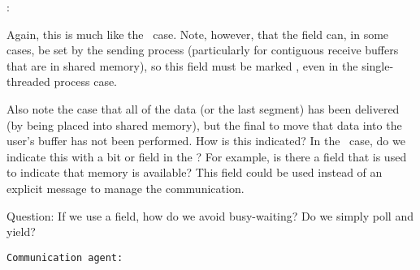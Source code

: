 :

Again, this is much like the \tcpname\ case.  Note, however, that the
 field can, in some cases, be set by the
sending process (particularly for contiguous receive buffers that are in
shared memory), so this field must be marked , even in the
single-threaded process case.

Also note the case that all of the data (or the last segment) has been
delivered (by being placed 
into shared memory), but the final  to move that data
into the user's buffer has not been performed.  How is this indicated?  
In the \shmemname\ case, do we indicate
this with a bit or field in the ?  For example, is
there a  field that is used to indicate
that memory is available?  This field could be used instead of an explicit
message to manage the communication.  

Question: If we use a  field, how do we avoid
busy-waiting?  Do we simply poll and yield?

\texttt{Communication agent:}




